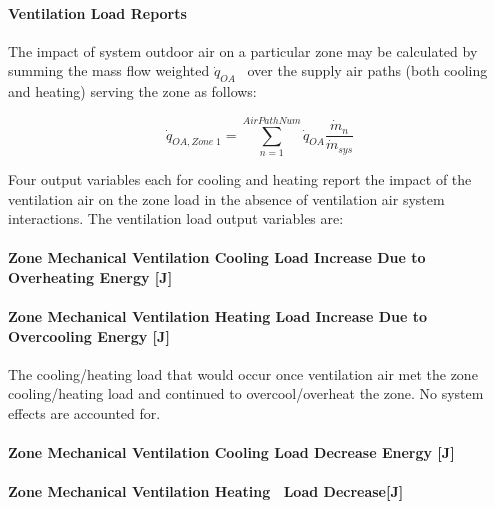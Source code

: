 \paragraph{Ventilation Load Reports}\label{ventilation-load-reports}

The impact of system outdoor air on a particular zone may be calculated by summing the mass flow weighted \({\dot q_{OA}}\) ~over the supply air paths (both cooling and heating) serving the zone as follows:

\begin{equation}
{\dot q_{OA,Zone\;1}} = \sum\limits_{n = 1}^{AirPathNum} {{{\dot q}_{OA}}\frac{{{{\dot m}_n}}}{{{{\dot m}_{sys}}}}}
\end{equation}

Four output variables each for cooling and heating report the impact of the ventilation air on the zone load in the absence of ventilation air system interactions. The ventilation load output variables are:

\paragraph{Zone Mechanical Ventilation Cooling Load Increase Due to Overheating Energy {[}J{]}}\label{zone-mechanical-ventilation-cooling-load-increase-due-to-overheating-energy-j}

\paragraph{Zone Mechanical Ventilation Heating Load Increase Due to Overcooling Energy {[}J{]}}\label{zone-mechanical-ventilation-heating-load-increase-due-to-overcooling-energy-j}

The cooling/heating load that would occur once ventilation air met the zone cooling/heating load and continued to overcool/overheat the zone. No system effects are accounted for.

\paragraph{Zone Mechanical Ventilation Cooling Load Decrease Energy {[}J{]}}\label{zone-mechanical-ventilation-cooling-load-decrease-energy-j}

\paragraph{Zone Mechanical Ventilation Heating~ Load Decrease{[}J{]}}\label{zone-mechanical-ventilation-heating-load-decreasej}

